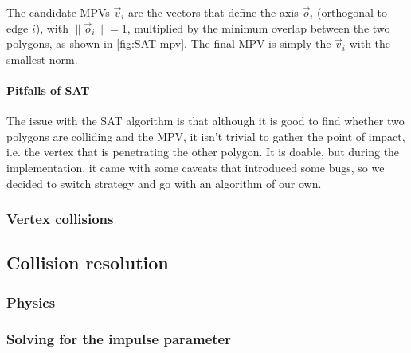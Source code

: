 The candidate MPVs $\vec v_i$ are the vectors that define the axis $\vec o_i$
(orthogonal to edge $i$), with $\| \vec o_i \| = 1$, multiplied by the minimum
overlap between the two polygons, as shown in \ref{fig:SAT-mpv}. The final MPV
is simply the $\vec v_i$ with the smallest norm.

\paragraph{Pitfalls of SAT} The issue with the SAT algorithm is that although it
is good to find whether two polygons are colliding and the MPV, it isn't trivial
to gather the point of impact, i.e. the vertex that is penetrating the other
polygon. It is doable, but during the implementation, it came with some caveats
that introduced some bugs, so we decided to switch strategy and go with an
algorithm of our own.

\subsubsection{Vertex collisions}

\subsection{Collision resolution}
\label{sub:resolution}
\subsubsection{Physics}
\subsubsection{Solving for the impulse parameter}
